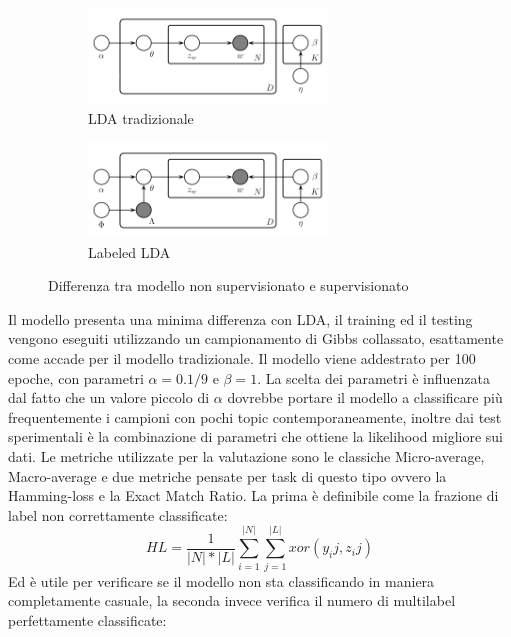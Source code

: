 \documentclass[technote]{IEEEtran}
\begin{document}
\begin{figure}[H]
\vspace{-5mm}
  \begin{subfigure}[b]{0.45\textwidth}
  \centering
    \includegraphics[width=0.7\textwidth]{images/lda}
    \caption{LDA tradizionale}
  \end{subfigure}
   \hfill
  \begin{subfigure}[b]{0.45\textwidth}
  \centering
    \includegraphics[width=0.7\textwidth]{images/llda}
    \caption{Labeled LDA}
  \end{subfigure}
  \caption{Differenza tra modello non supervisionato e supervisionato}
  \label{fig_llda}
\end{figure}
Il modello presenta una minima differenza con LDA, il training ed il testing vengono eseguiti utilizzando un campionamento di Gibbs collassato, esattamente come accade per il modello tradizionale. Il modello viene addestrato per 100 epoche, con parametri $ \alpha = 0.1 / 9 $ e $ \beta = 1 $. La scelta dei parametri è influenzata dal fatto che un valore piccolo di $ \alpha $ dovrebbe portare il modello a classificare più frequentemente i campioni con pochi topic contemporaneamente, inoltre dai test sperimentali è la combinazione di parametri che ottiene la likelihood migliore sui dati.
Le metriche utilizzate per la valutazione sono le classiche Micro-average, Macro-average e due metriche pensate per task di questo tipo ovvero la Hamming-loss e la Exact Match Ratio. La prima è definibile come la frazione di label non correttamente classificate:
\begin{equation}
HL=\frac{1}{|N|*|L|}\sum_{i=1}^{|N|}\sum_{j=1}^{|L|}xor(y_ij, z_ij)
\end{equation}
Ed è utile per verificare se il modello non sta classificando in maniera completamente casuale, la seconda invece verifica il numero di multilabel perfettamente classificate:\\
\end{document}
